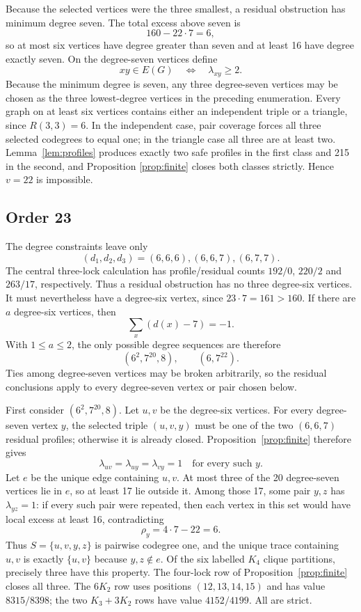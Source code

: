 \documentclass[11pt]{article}
\theoremstyle{remark}
\begin{document}
Because the selected vertices were the three smallest, a residual
obstruction has minimum degree seven.  The total excess above seven is
\[
160-22\cdot7=6,
\]
so at most six vertices have degree greater than seven and at least 16 have
degree exactly seven.  On the degree-seven vertices define
\[
xy\in E(G)\quad\Longleftrightarrow\quad\lambda_{xy}\ge2.
\]
Because the minimum degree is seven, any three degree-seven vertices may be
chosen as the three lowest-degree vertices in the preceding enumeration.
Every graph on at least six vertices contains either an independent triple
or a triangle, since $R(3,3)=6$.  In the independent case, pair coverage
forces all three selected codegrees to equal one; in the triangle case all
three are at least two.  Lemma~\ref{lem:profiles} produces exactly two safe
profiles in the first class and 215 in the second, and Proposition
\ref{prop:finite} closes both classes strictly.  Hence $v=22$ is impossible.

\subsection{Order 23}\label{subsec:v23}

The degree constraints leave only
\[
(d_1,d_2,d_3)=(6,6,6),(6,6,7),(6,7,7).
\]
The central three-lock calculation has profile/residual counts
$192/0$, $220/2$ and $263/17$, respectively.  Thus a residual obstruction
has no three degree-six vertices.  It must nevertheless have a degree-six
vertex, since $23\cdot7=161>160$.  If there are $a$ degree-six vertices,
then
\[
\sum_x(d(x)-7)=-1.
\]
With $1\le a\le2$, the only possible degree sequences are therefore
\begin{equation}\label{eq:v23-sequences}
(6^2,7^{20},8),\qquad(6,7^{22}).
\end{equation}
Ties among degree-seven vertices may be broken arbitrarily, so the residual
conclusions apply to every degree-seven vertex or pair chosen below.

First consider $(6^2,7^{20},8)$.  Let $u,v$ be the degree-six vertices.
For every degree-seven vertex $y$, the selected triple $(u,v,y)$ must be one
of the two $(6,6,7)$ residual profiles; otherwise it is already closed.
Proposition~\ref{prop:finite} therefore gives
\[
\lambda_{uv}=\lambda_{uy}=\lambda_{vy}=1
\quad\text{for every such }y.
\]
Let $e$ be the unique edge containing $u,v$.  At most three of the 20
degree-seven vertices lie in $e$, so at least 17 lie outside it.  Among those
17, some pair $y,z$ has $\lambda_{yz}=1$: if every such pair were repeated,
then each vertex in this set would have local excess at least 16, contradicting
\[
\rho_y=4\cdot7-22=6.
\]
Thus $S=\{u,v,y,z\}$ is pairwise codegree one, and the unique trace
containing $u,v$ is exactly $\{u,v\}$ because $y,z\notin e$.  Of the six
labelled $K_4$ clique partitions, precisely three have this property.  The
four-lock row of Proposition~\ref{prop:finite} closes all three.  The
$6K_2$ row uses positions $(12,13,14,15)$ and has value $8315/8398$; the two
$K_3+3K_2$ rows have value $4152/4199$.  All are strict.
\end{document}
